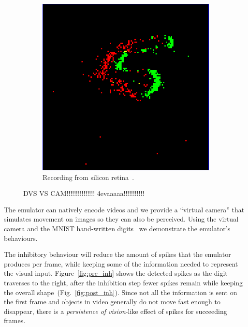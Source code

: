 \documentclass[conference]{IEEEtran}
\begin{document}
\begin{figure}[htb]
\begin{subfigure}[b]{0.24\textwidth}
  \includegraphics[width=\textwidth]{dvs_demo}
  \caption{Recording from silicon retina~\cite{bernabeDVS}.}
  \label{fig:dvs_demo}
\end{subfigure}
  
  \caption{DVS VS CAM!!!!!!!!!!!!!!! 4evaaaaa!!!!!!!!!!!}
  \label{fig:dvs_vs_cam}
  
\end{figure}



The emulator can natively encode videos and we provide a ``virtual camera'' that simulates movement on images so they can also be perceived. Using the virtual camera and the MNIST hand-written digits~\cite{mnist} we demonstrate the emulator's behaviours.

The inhibitory behaviour will reduce the amount of spikes that the emulator produces per frame, while keeping some of the information needed to represent the visual input. Figure~\ref{fig:pre_inh} shows the detected spikes as the digit traverses to the right, after the inhibition step fewer spikes remain while keeping the overall shape~(Fig.~\ref{fig:post_inh}). Since not all the information is sent on the first frame and objects in video generally do not move fast enough to disappear, there is a \textit{persistence of vision}-like effect of spikes for succeeding frames.
\end{document}
